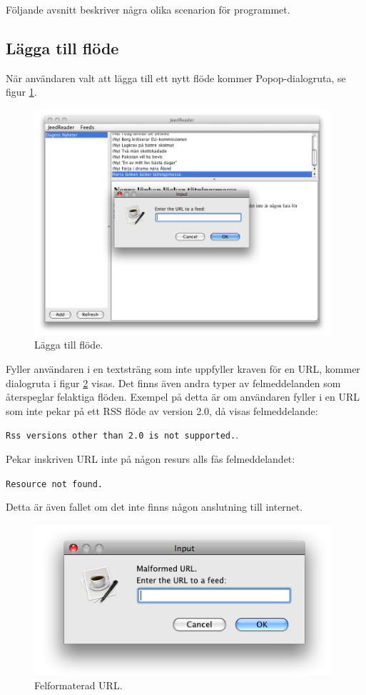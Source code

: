 \documentclass[titlepage, twoside, a4paper, 12pt]{article}
\begin{document}
Följande avsnitt beskriver några olika scenarion för programmet.

\subsection{Lägga till flöde}
När användaren valt att lägga till ett nytt flöde kommer
Popop-dialogruta, se figur \ref{fig:add-feed}.

\begin{figure}[H]
  \begin{center}
    \includegraphics[width=110mm]{images/add-feed.png}
    \caption{Lägga till flöde.}
    \label{fig:add-feed}
  \end{center}
\end{figure}

Fyller användaren i en textsträng som inte uppfyller kraven för en
URL, kommer dialogruta i figur \ref{fig:malformed-url} visas. Det
finns även andra typer av felmeddelanden som återspeglar felaktiga
flöden. Exempel på detta är om användaren fyller i en URL som inte
pekar på ett RSS flöde av version 2.0, då visas felmeddelande:

\verb!Rss versions other than 2.0 is not supported.!.

Pekar inskriven URL inte på någon resurs alls fås felmeddelandet:

\verb!Resource not found.!

Detta är även fallet om det inte finns någon anslutning till
internet.

\begin{figure}[H]
  \begin{center}
    \includegraphics[width=110mm]{images/malformed-url.png}
    \caption{Felformaterad URL.}
    \label{fig:malformed-url}
  \end{center}
\end{figure}
\end{document}
